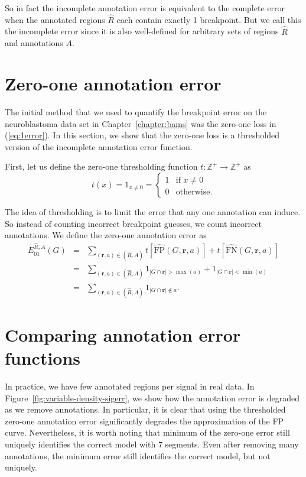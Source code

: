 \documentclass{jsfds} %
\renewcommand{\r}{ \mathbf{ r} }
\begin{document}
So in fact the incomplete annotation error is equivalent to the
complete error when the annotated regions $\hat R$ each contain
exactly 1 breakpoint. But we call this the incomplete error since it
is also well-defined for arbitrary sets of regions $\hat R$ and
annotations $A$.

\section{Zero-one annotation error}
\label{sec:zero-one}
The initial method that we used to quantify the breakpoint error on
the neuroblastoma data set in Chapter~\ref{chapter:bams} was the
zero-one loss in (\ref{eq:1error}). In this section, we show
that the zero-one loss is a thresholded version of the incomplete
annotation error function.

First, let us define the zero-one thresholding function
$t:\mathbb Z^+\rightarrow\mathbb Z^+$ as
\begin{equation}
  \label{eq:thresholding}
  t(x)=1_{x\neq 0} =
  \begin{cases}
    1 & \text{if }x\neq 0\\
    0 & \text{otherwise}.
  \end{cases}
\end{equation}

The idea of thresholding is to limit the error that any one annotation
can induce. So instead of counting incorrect breakpoint guesses, we count
incorrect annotations. We define the zero-one annotation error as
\begin{eqnarray}
  \label{eq:ann01err}
  E_{01}^{\hat R,A}(G)
&=&\nonumber
 \sum_{(\r,a)\in(\hat R,A)} 
t\left[\hat{\text{FP}}(G,\r,a)\right]+
t\left[\hat{\text{FN}}(G,\r,a)\right]\\
&=&\nonumber
 \sum_{(\r,a)\in(\hat R,A)} 
1_{|G\cap\r|>\max(a)}+
1_{|G\cap \r|<\min(a)}\\
&=&
 \sum_{(\r,a)\in(\hat R,A)} 
1_{|G\cap\r|\not\in a}.
\end{eqnarray}

\newpage 

\section{Comparing annotation error functions}

In practice, we have few annotated regions per signal in real data. In
Figure~\ref{fig:variable-density-sigerr}, we show how the annotation
error is degraded as we remove annotations. In particular, it is clear
that using the thresholded zero-one annotation error significantly
degrades the approximation of the FP curve. Nevertheless, it is worth
noting that minimum of the zero-one error still uniquely identifies
the correct model with 7 segments. Even after removing many
annotations, the minimum error still identifies the correct
model, but not uniquely.
\end{document}
